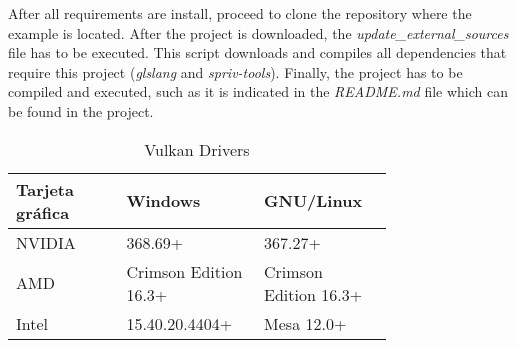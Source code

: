 After all requirements are install, proceed to clone the repository where the example is located. After the project
is downloaded, the \emph{update\_external\_sources} file has to be executed. This script downloads and compiles
all dependencies that require this project (\emph{glslang} and \emph{spriv-tools}). Finally, the project has to be
compiled and executed, such as it is indicated in the \emph{README.md} file which can be found in the project.

\begin{table*}[t]
  \centering
  \begin{tabular}{p{0.25\linewidth}p{0.25\linewidth}p{0.25\linewidth}}
    \toprule
    Tarjeta gráfica & Windows    & GNU/Linux \\
    \midrule
    NVIDIA          & 368.69+                   & 367.27+ \\
    AMD             & Crimson Edition 16.3+     & Crimson Edition 16.3+ \\
    Intel           & 15.40.20.4404+            & Mesa 12.0+ \\
    \bottomrule
  \end{tabular}
  \caption{Vulkan Drivers}
  \label{tab:vulkan_drivers}
\end{table*}
